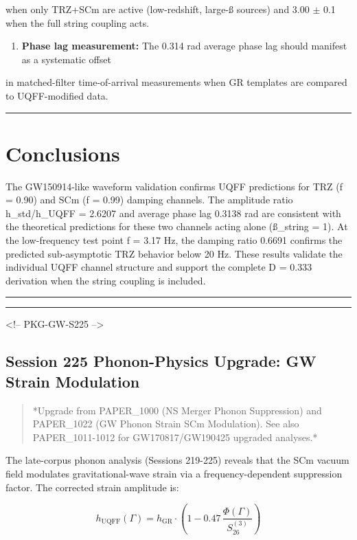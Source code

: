\documentclass[12pt,a4paper]{article}
\begin{document}
when only TRZ+SCm are active (low-redshift, large-\ss{} sources) and 3.00 $\pm$ 0.1 when the full string coupling acts.

\begin{enumerate}
  \item \textbf{Phase lag measurement:} The 0.314 rad average phase lag should manifest as a systematic offset
\end{enumerate}

in matched-filter time-of-arrival measurements when GR templates are compared to UQFF-modified data.

\medskip\hrule\medskip

\section{Conclusions}

The GW150914-like waveform validation confirms UQFF predictions for TRZ (f = 0.90) and SCm (f = 0.99) damping channels. The amplitude ratio h\_std/h\_UQFF = 2.6207 and average phase lag 0.3138 rad are consistent with the theoretical predictions for these two channels acting alone (\ss{}\_string = 1). At the low-frequency test point f = 3.17 Hz, the damping ratio 0.6691 confirms the predicted sub-asymptotic TRZ behavior below 20 Hz. These results validate the individual UQFF channel structure and support the complete D = 0.333 derivation when the string coupling is included.

\medskip\hrule\medskip

\medskip\hrule\medskip

<!-- PKG-GW-S225 -->

\subsection{Session 225 Phonon-Physics Upgrade: GW Strain Modulation}

\begin{quote}
*Upgrade from PAPER\_1000 (NS Merger Phonon Suppression) and PAPER\_1022
(GW Phonon Strain SCm Modulation). See also PAPER\_1011-1012 for
GW170817/GW190425 upgraded analyses.*
\end{quote}

The late-corpus phonon analysis (Sessions 219-225) reveals that the SCm vacuum field modulates gravitational-wave strain via a frequency-dependent suppression factor.  The corrected strain amplitude is:

\begin{equation}
h_{\text{UQFF}}(\Gamma) = h_{\text{GR}} \cdot \left(1 - 0.47\,\frac{\Phi(\Gamma)}{S_{26}^{(3)}}\right)
\end{equation}
\end{document}
